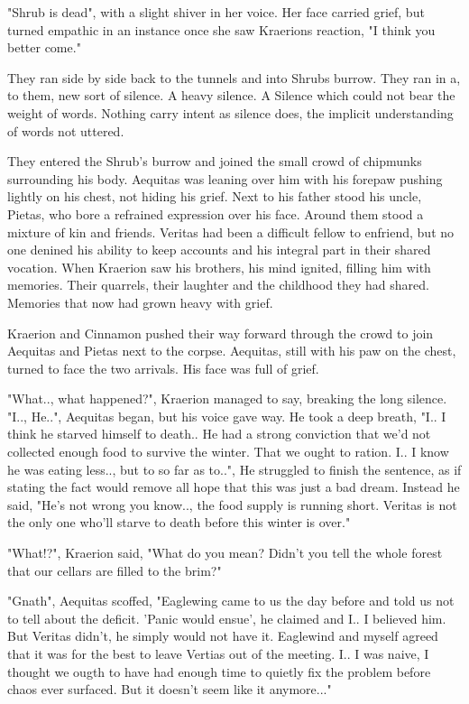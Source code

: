 \documentclass[smalldemyvopaper,11pt,twoside,onecolumn,openright,extrafontsizes]{memoir}
\begin{document}
"Shrub is dead", with a slight shiver in her voice. Her face carried grief, but turned empathic in an instance once she saw Kraerions reaction, "I think you better come."

They ran side by side back to the tunnels and into Shrubs burrow. They ran in a, to them, new sort of silence. A heavy silence. A Silence which could not bear the weight of words. Nothing carry intent as silence does, the implicit understanding of words not uttered. 

They entered the Shrub's burrow and joined the small crowd of chipmunks surrounding his body. Aequitas was leaning over him with his forepaw pushing lightly on his chest, not hiding his grief. Next to his father stood his uncle, Pietas, who bore a refrained expression over his face. Around them stood a mixture of kin and friends. Veritas had been a difficult fellow to enfriend, but no one denined his ability to keep accounts and his integral part in their shared vocation. When Kraerion saw his brothers, his mind ignited, filling him with memories. Their  quarrels, their laughter and the childhood they had shared. Memories that now had grown heavy with grief.

Kraerion and Cinnamon pushed their way forward through the crowd to join Aequitas and Pietas next to the corpse. Aequitas, still with his paw on the chest, turned to face the two arrivals. His face was full of grief. 

"What.., what happened?", Kraerion managed to say, breaking the long silence.
"I.., He..", Aequitas began, but his voice gave way. He took a deep breath, "I.. I think he starved himself to death.. He had a strong conviction that we'd not collected enough food to survive the winter. That we ought to ration. I.. I know he was eating less.., but to so far as to..", He struggled to finish the sentence, as if stating the fact would remove all hope that this was just a bad dream. Instead he said, "He's not wrong you know.., the food supply is running short. Veritas is not the only one who'll starve to death before this winter is over."

"What!?", Kraerion said, "What do you mean? Didn't you tell the whole forest that our cellars are filled to the brim?"

"Gnath", Aequitas scoffed, "Eaglewing came to us the day before and told us not to tell about the deficit. 'Panic would ensue', he claimed and I.. I believed him. But Veritas didn't, he simply would not have it. Eaglewind and myself agreed that it was for the best to leave Vertias out of the meeting. I.. I was naive, I thought we ougth to have had enough time to quietly fix the problem before chaos ever surfaced. But it doesn't seem like it anymore..."
\end{document}
